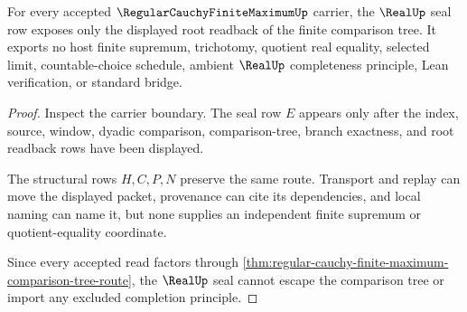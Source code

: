 \begin{theorem}
\label{thm:regular-cauchy-finite-maximum-real-seal-nonescape}
For every accepted $\RegularCauchyFiniteMaximumUp$ carrier, the $\RealUp$ seal row exposes only the displayed root readback of the finite comparison tree. It exports no host finite supremum, trichotomy, quotient real equality, selected limit, countable-choice schedule, ambient $\RealUp$ completeness principle, Lean verification, or standard bridge.
\end{theorem}
\begin{proof}
Inspect the carrier boundary. The seal row $E$ appears only after the index, source, window, dyadic comparison, comparison-tree, branch exactness, and root readback rows have been displayed.

The structural rows $H,C,P,N$ preserve the same route. Transport and replay can move the displayed packet, provenance can cite its dependencies, and local naming can name it, but none supplies an independent finite supremum or quotient-equality coordinate.

Since every accepted read factors through \autoref{thm:regular-cauchy-finite-maximum-comparison-tree-route}, the $\RealUp$ seal cannot escape the comparison tree or import any excluded completion principle.
\end{proof}




